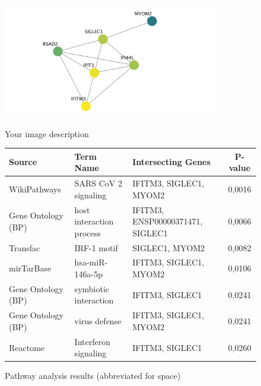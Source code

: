 \documentclass[12pt]{report}
\renewcommand{\arraystretch}{1.5}
\begin{document}
        \begin{figure}[ht]
            \centering
            \begin{minipage}[t]{0.35\textwidth} %
                \vspace{0pt} %
                \includegraphics[width=\linewidth,height=5cm,keepaspectratio]{Cytoscape/cyto_females_50_70.png}
                \caption*{Your image description} %
            \end{minipage}
            \hfill
            \begin{minipage}[t]{0.62\textwidth} %
                \scriptsize %
                \setlength{\tabcolsep}{4pt} %
                \renewcommand{\arraystretch}{1.1} %
                \begin{tabular}{@{}>{\raggedright}p{2.2cm}>{\raggedright}p{2.5cm}>{\raggedright}p{2.2cm}c@{}}
                    \toprule
                    \textbf{Source} & \textbf{Term Name} & \textbf{Intersecting Genes} & \textbf{P-value} \\
                    \midrule
                    WikiPathways & SARS CoV 2 signaling & IFITM3, SIGLEC1, MYOM2 & 0,0016 \\
                    Gene Ontology (BP) & host interaction process & IFITM3, ENSP00000371471, SIGLEC1 & 0,0066 \\
                    Transfac & IRF-1 motif & SIGLEC1, MYOM2 & 0,0082 \\
                    mirTarBase & hsa-miR-146a-5p & IFITM3, SIGLEC1, MYOM2 & 0,0106 \\
                    Gene Ontology (BP) & symbiotic interaction & IFITM3, SIGLEC1 & 0,0241 \\
                    Gene Ontology (BP) & virus defense & IFITM3, SIGLEC1, MYOM2 & 0,0241 \\
                    Reactome & Interferon signaling & IFITM3, SIGLEC1 & 0,0260 \\
                    \bottomrule
                \end{tabular}
                \caption{Pathway analysis results (abbreviated for space)}
                \label{tab:pathways}
            \end{minipage}
        \end{figure}
                
\end{document}
